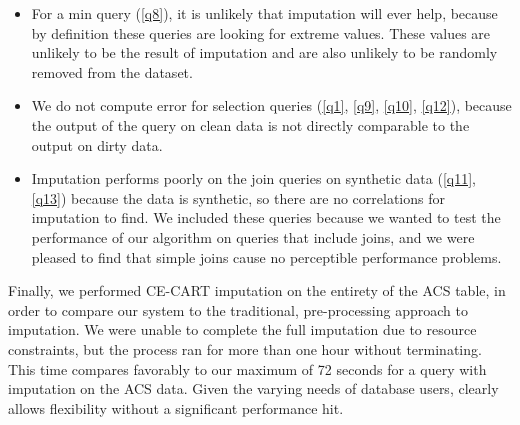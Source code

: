 {\begin{itemize}
\item For a min query (\ref{q8}), it is unlikely that imputation will ever help, because by definition these queries are looking for extreme values.
These values are unlikely to be the result of imputation and are also unlikely to be randomly removed from the dataset.

\item We do not compute error for selection queries (\ref{q1}, \ref{q9}, \ref{q10}, \ref{q12}), because the output of the query on clean data is not directly comparable to the output on dirty data.

  \item Imputation performs poorly on the join queries on synthetic data (\ref{q11}, \ref{q13}) because the data is synthetic, so there are no correlations for imputation to find. We included these queries because we wanted to test the performance of our algorithm on queries that include joins, and we were pleased to find that simple joins cause no perceptible performance problems.
\end{itemize}

Finally, we performed CE-CART imputation on the entirety of the ACS table, in order to compare our system to the traditional, pre-processing approach to imputation.
We were unable to complete the full imputation due to resource constraints, but the process ran for more than one hour without terminating.
This time compares favorably to our maximum of 72 seconds for a query with imputation on the ACS data.
Given the varying needs of database users, \ProjectName{} clearly allows flexibility without a significant performance hit.
}



